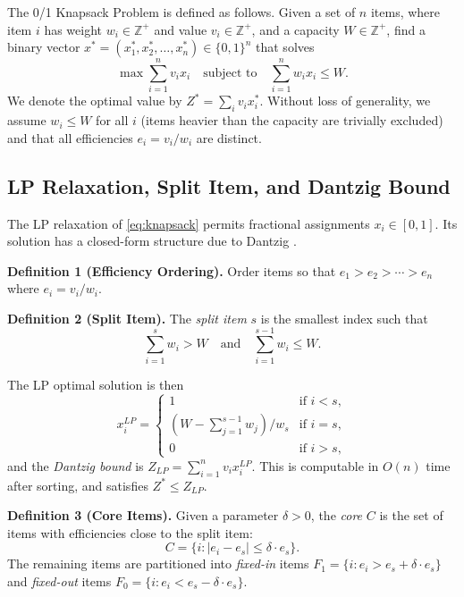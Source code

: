 \documentclass[conference]{IEEEtran}
\begin{document}
The 0/1 Knapsack Problem is defined as follows. Given a set of $n$ items, where item $i$ has weight $w_i \in \mathbb{Z}^+$ and value $v_i \in \mathbb{Z}^+$, and a capacity $W \in \mathbb{Z}^+$, find a binary vector $x^* = (x_1^*, x_2^*, \ldots, x_n^*) \in \{0,1\}^n$ that solves
\begin{equation}
    \max \sum_{i=1}^{n} v_i x_i \quad \text{subject to} \quad \sum_{i=1}^{n} w_i x_i \leq W.
    \label{eq:knapsack}
\end{equation}
We denote the optimal value by $Z^* = \sum_{i} v_i x_i^*$. Without loss of generality, we assume $w_i \leq W$ for all $i$ (items heavier than the capacity are trivially excluded) and that all efficiencies $e_i = v_i / w_i$ are distinct.

\subsection{LP Relaxation, Split Item, and Dantzig Bound}

The LP relaxation of \eqref{eq:knapsack} permits fractional assignments $x_i \in [0,1]$. Its solution has a closed-form structure due to Dantzig \cite{ref1}.

\textbf{Definition 1 (Efficiency Ordering).} Order items so that $e_1 > e_2 > \cdots > e_n$ where $e_i = v_i / w_i$.

\textbf{Definition 2 (Split Item).} The \textit{split item} $s$ is the smallest index such that
\begin{equation}
    \sum_{i=1}^{s} w_i > W \quad \text{and} \quad \sum_{i=1}^{s-1} w_i \leq W.
    \label{eq:split}
\end{equation}

The LP optimal solution is then
\begin{equation}
    x_i^{LP} = \begin{cases}
    1 & \text{if } i < s, \\
    (W - \sum_{j=1}^{s-1} w_j) / w_s & \text{if } i = s, \\
    0 & \text{if } i > s,
    \end{cases}
    \label{eq:lpsol}
\end{equation}
and the \textit{Dantzig bound} is $Z_{LP} = \sum_{i=1}^{n} v_i x_i^{LP}$. This is computable in $O(n)$ time after sorting, and satisfies $Z^* \leq Z_{LP}$.

\textbf{Definition 3 (Core Items).} Given a parameter $\delta > 0$, the \textit{core} $C$ is the set of items with efficiencies close to the split item:
\begin{equation}
    C = \{i : |e_i - e_s| \leq \delta \cdot e_s\}.
    \label{eq:core}
\end{equation}
The remaining items are partitioned into \textit{fixed-in} items $F_1 = \{i : e_i > e_s + \delta \cdot e_s\}$ and \textit{fixed-out} items $F_0 = \{i : e_i < e_s - \delta \cdot e_s\}$.
\end{document}
